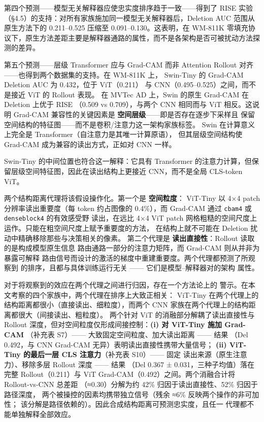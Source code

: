 \documentclass[11pt,a4paper]{article}
\begin{document}
第四个预测——模型无关解释器应使忠实度排序趋于一致——得到了 RISE 实验（§4.5）的支持：对所有家族施加同一模型无关解释器后，Deletion AUC 范围从原生方法下的 0.211–0.525 压缩至 0.091–0.130。这表明，在 WM-811K 零填充协议下，原生方法差距主要是解释器通路的属性，而不是各架构是否可被扰动方法探测的差异。

第五个预测——层级 Transformer 应与 Grad-CAM 而非 Attention Rollout 对齐——也得到两个数据集的支持。在 WM-811K 上， Swin-Tiny 的 Grad-CAM Deletion AUC 为 0.432，位于 ViT（0.211） 与 CNN（0.495–0.525）之间，而不是接近 ViT 的 Rollout 表现。 在 MVTec AD 上，Swin 的原生 Grad-CAM 在 Deletion 上优于 RISE （0.509 vs 0.709），与两个 CNN 相同而与 ViT 相反。这说明 Grad-CAM 兼容性的关键因素是 \textbf{空间层级}——即是否存在逐步下采样且 保留空间结构的特征图——而不是卷积/注意力这一架构家族标签。 Swin 在计算意义上完全是 Transformer（自注意力是其唯一计算原语）， 但其层级空间结构使 Grad-CAM 成为兼容的读出方式，正如对 CNN 一样。

Swin-Tiny 的中间位置也符合这一解释：它具有 Transformer 的注意力计算，但保留层级空间特征图，因此在读出结构上更接近 CNN，而不是全局 CLS-token ViT。

两个结构距离代理将该假设操作化。第一个是 \textbf{空间粒度}： ViT-Tiny 以 4×4 patch 分辨率读出重要度（每 token 约占图像的 0.4\%），而 Grad-CAM 通过 \texttt{cbam4} 或 \texttt{denseblock4} 的有效感受野 读出，在远比 4×4 ViT patch 网格粗糙的空间尺度上运作。只能在粗空间尺度上赋予重要度的方法， 在结构上就不可能在 Deletion 扰动中精确移除那些与决策相关的像素。 第二个代理是 \textbf{读出直接性}：Rollout 读取的是构成模型原生信息 路由通路一部分的注意力矩阵，而 Grad-CAM 则从并非为暴露可解释 路由信号而设计的激活的梯度中重建重要度。两个代理都预测了所观察到 的排序，且都与具体训练运行无关 —— 它们是模型–解释器对的架构 属性。

对于将观察到的效应在两个代理之间进行归因，存在一个方法论上的 警示。在本文考察的四个家族中，两个代理在排序上大致正相关： ViT-Tiny 在两个代理上的结构距离都很小（直接读出、细粒度），而两个 CNN 家族在两个代理上的结构距离都很大（间接读出、粗粒度）。 两个针对 ViT 的消融部分解耦了读出直接性与 Rollout 深度，但对空间粒度仅形成间接控制：\textbf{(i) 对 ViT-Tiny 施加 Grad-CAM} （补充表 S7）—— 大致固定空间粒度、加大读出距离 —— 结果 （Del 0.492，与 CNN Grad-CAM 无异）表明读出直接性携带大量信号； \textbf{(ii) ViT-Tiny 的最后一层 CLS 注意力}（补充表 S10）—— 固定 读出来源（原生注意力）、移除多层 Rollout 深度 —— 结果 （Del 0.367 ± 0.031，三种子均值）落在完整 Rollout（0.211）与 ViT Grad-CAM（0.492）之间。两个消融合计将 Rollout-vs-CNN 总差距 （≈0.30）分解为约 42\% 归因于读出直接性、52\% 归因于路径深度， 两个被操控的因素均携带独立信号（残余 ≈6\% 反映两个操作的非可加性； 该分解是路径依赖的）。因此合成结构距离可预测忠实度，且任一 代理都不能单独解释全部效应。
\end{document}
